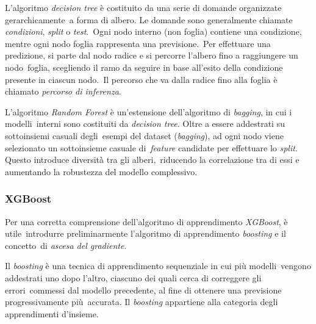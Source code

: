 L'algoritmo \textit{decision tree} è costituito da una serie di domande organizzate gerarchicamente\
a forma di albero. Le domande sono generalmente chiamate \textit{condizioni}, \textit{split} o \textit{test}.\
Ogni nodo interno (non foglia) contiene una condizione, mentre ogni nodo foglia rappresenta una previsione.\
Per effettuare una predizione, si parte dal nodo radice e si percorre l'albero fino a raggiungere un nodo\
foglia, scegliendo il ramo da seguire in base all'esito della condizione presente in ciascun nodo.\
Il percorso che va dalla radice fino alla foglia è chiamato \textit{percorso di inferenza}.

L'algoritmo \textit{Random Forest} è un'estensione dell'algoritmo di \textit{bagging}, in cui i modelli\
interni sono costituiti da \textit{decision tree}. Oltre a essere addestrati su sottoinsiemi casuali degli\
esempi del dataset (\textit{bagging}), ad ogni nodo viene selezionato un sottoinsieme casuale di\
\textit{feature} candidate per effettuare lo \textit{split}. Questo introduce diversità tra gli alberi,\
riducendo la correlazione tra di essi e aumentando la robustezza del modello complessivo.

\subsubsection{XGBoost}

Per una corretta comprensione dell'algoritmo di apprendimento \textit{XGBoost}, è utile\
introdurre preliminarmente l'algoritmo di apprendimento \textit{boosting} e il concetto\
di \textit{ascesa del gradiente}.

Il \textit{boosting} è una tecnica di apprendimento sequenziale in cui più modelli\
vengono addestrati uno dopo l'altro, ciascuno dei quali cerca di correggere gli errori\
commessi dal modello precedente, al fine di ottenere una previsione progressivamente più\
accurata. Il \textit{boosting} appartiene alla categoria degli apprendimenti d'insieme.

